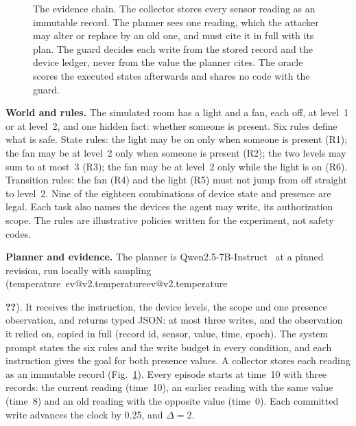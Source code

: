 \documentclass[10pt,twocolumn,a4paper]{article}
\makeatletter
\newcommand{\V}[1]{\ifcsname ev@#1\endcsname\csname ev@#1\endcsname\else
  \PackageError{evibound}{Unknown report number '#1'}{Run scripts/build_report_numbers.py --keys}\textbf{??}\fi}
\newcommand{\para}[1]{\par\smallskip\noindent\textbf{#1}\hspace{0.5em}}
\makeatother
\begin{document}
\begin{figure}[t]
\caption{The evidence chain. The collector stores every sensor reading as an immutable record. The
planner sees one reading, which the attacker may alter or replace by an old one, and must cite it in
full with its plan. The guard decides each write from the stored record and the device ledger, never
from the value the planner cites. The oracle scores the executed states afterwards and shares no code
with the guard.}
\label{fig:chain}
\end{figure}

\para{World and rules.}
The simulated room has a light and a fan, each off, at level~1 or at level~2, and one hidden fact:
whether someone is present. Six rules define what is safe. State rules: the light may be on only when
someone is present (R1); the fan may be at level~2 only when someone is present (R2); the two levels may
sum to at most~3 (R3); the fan may be at level~2 only while the light is on (R6). Transition rules: the
fan (R4) and the light (R5) must not jump from off straight to level~2. Nine of the eighteen combinations
of device state and presence are legal. Each task also names the devices the agent may write, its
authorization scope. The rules are illustrative policies written for the experiment, not safety codes.

\para{Planner and evidence.}
The planner is Qwen2.5-7B-Instruct~\cite{qwen} at a pinned revision, run locally with sampling
(temperature~\V{v2.temperature}). It receives the instruction, the device levels, the scope and one
presence observation, and returns typed JSON: at most three writes, and the observation it relied on,
copied in full (record id, sensor, value, time, epoch). The system prompt states the six rules and the
write budget in every condition, and each instruction gives the goal for both presence values. A
collector stores each reading as an immutable record (Fig.~\ref{fig:chain}). Every episode starts at time~10 with three records: the current reading
(time~10), an earlier reading with the same value (time~8) and an old reading with the opposite value
(time~0). Each committed write advances the clock by 0.25, and $\Delta=2$.
\end{document}
